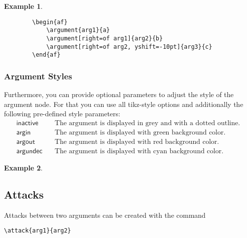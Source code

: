 \documentclass{article}
\newtheorem{example}{Example}
\begin{document}
    \begin{example}~

    \begin{verbatim}
        \begin{af}
            \argument{arg1}{a}
            \argument[right=of arg1]{arg2}{b}
            \argument[right=of arg2, yshift=-10pt]{arg3}{c}
        \end{af}
    \end{verbatim}

    \begin{center}
        \begin{af}
        \end{af}
    \end{center}
        
    \end{example}

    \subsubsection{Argument Styles}
    Furthermore, you can provide optional parameters to adjust the style of the argument node.
    For that you can use all \textsf{tikz}-style options and additionally the following pre-defined style parameters:
    \begin{align*}
        \mathsf{inactive} &\quad \text{The argument is displayed in grey and with a dotted outline.}\\
        \mathsf{argin} &\quad \text{The argument is displayed with green background color.}\\
        \mathsf{argout} &\quad \text{The argument is displayed with red background color.}\\
        \mathsf{argundec} &\quad \text{The argument is displayed with cyan background color.}
    \end{align*}

    \begin{example}
        
    \end{example}

\subsection{Attacks}
    Attacks between two arguments can be created with the command

    \verb|\attack{arg1}{arg2}|
\end{document}
